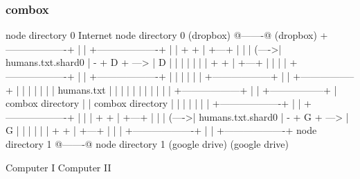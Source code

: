 \begin{frame}[fragile]
  \frametitle{combox}

  {\tiny
  \begin{semiverbatim}

         node directory 0                Internet              node directory 0
         (dropbox)                       @-------@             (dropbox)
        +-------------------+            |       |            +-------------------+
        |                   |    + +     | +---+ |            |                   |
  (---->| humans.txt.shard0 | - + D + ---> | D | |            |                   |
  |     |                   |    + +     | +---+ |            |                   |
  |     +-------------------+            |       |            +-------------------+
  |                                      |       |
  |                                      |       |
 +------------------+                    |       |                        +-----------------+
 |                  |                    |       |                        |                 |
 |  humans.txt      |                    |       |                        |                 |
 |                  |                    |       |                        |                 |
 +------------------+                    |       |                        +-----------------+
  |  combox directory                    |       |                      combox directory
  |                                      |       |
  |                                      |       |
  |     +-------------------+            |       |             +-------------------+
  |     |                   |    + +     | +---+ |             |                   |
  (---->| humans.txt.shard0 | - + G + ---> | G | |             |                   |
        |                   |    + +     | +---+ |             |                   |
        +-------------------+            |       |             +-------------------+
         node directory 1                @-------@              node directory 1
         (google drive)                                         (google drive)

  Computer I                                                                    Computer II
  \end{semiverbatim}
  }

\end{frame}


